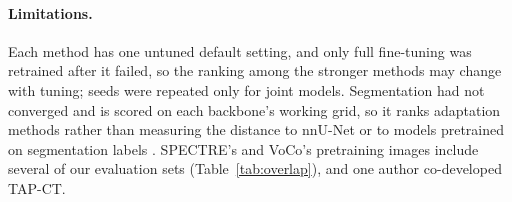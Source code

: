 \paragraph{Limitations.} Each method has one untuned default setting, and only full fine-tuning was retrained after it failed, so the ranking among the stronger methods may change with tuning; seeds were repeated only for joint models. Segmentation had not converged and is scored on each backbone's working grid, so it ranks adaptation methods rather than measuring the distance to nnU-Net \citep{isensee2021nnunet} or to models pretrained on segmentation labels \citep{li2024suprem,he2024vista3d}. SPECTRE's and VoCo's pretraining images include several of our evaluation sets (Table~\ref{tab:overlap}), and one author co-developed TAP-CT.

